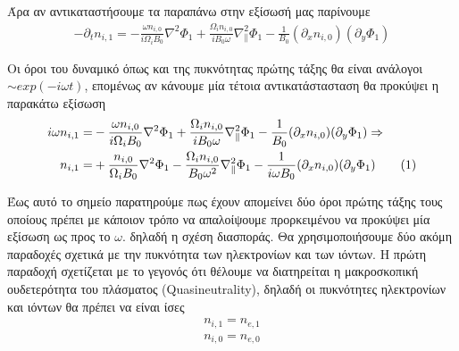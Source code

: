 \documentclass[a4paper]{article}
\newcommand\numberthis{\addtocounter{equation}{1}\tag{\theequation}}
\begin{document}
     Άρα αν αντικαταστήσουμε τα παραπάνω στην εξίσωσή μας παρίνουμε 
             	\begin{align}\label{eq13}
             		-\partial_t n_{i,1} = -\frac{\omega n_{i,0}}{i\Omega_iB_0} \nabla^2\Phi_1 
             		  +\frac{\Omega_in_{i,0}}{iB_0\omega }\nabla_{\parallel}^2\Phi_1   
             		  -\frac{1}{B_0}(\partial_xn_{i,0})(\partial_y\Phi_1)
				\end{align}
				
	Οι όροι του δυναμικό όπως και της πυκνότητας πρώτης τάξης θα είναι ανάλογοι $\sim exp(-i\omega t)$, επομένως αν κάνουμε μία τέτοια αντικατάστασταση θα προκύψει η παρακάτω εξίσωση 
	\begin{align*}\label{eq14}
		i\omega n_{i,1} =& -\frac{\omega n_{i,0}}{i\Omega_iB_0} \nabla^2\Phi_1 +\frac{\Omega_in_{i,0}}{iB_0\omega }\nabla_{\parallel}^2\Phi_1-\frac{1}{B_0}(\partial_xn_{i,0})(\partial_y\Phi_1) \Rightarrow\\ 
		n_{i,1} =&+ \frac{n_{i,0}}{\Omega_i B_0}\nabla^2\Phi_1 - \frac{\Omega_in_{i,0}}{B_0\omega^2	}\nabla_{\parallel}^2\Phi_1 - \frac{1}{i\omega B_0}(\partial_xn_{i,0})(\partial_y\Phi_1) \numberthis
	\end{align*}
	
		Έως αυτό το σημείο παρατηρούμε πως έχουν απομείνει δύο όροι πρώτης τάξης τους οποίους πρέπει με κάποιον τρόπο να απαλοίψουμε προρκειμένου να προκύψει μία εξίσωση ως προς το $\omega$. δηλαδή η σχέση διασποράς. Θα χρησιμοποιήσουμε δύο ακόμη παραδοχές σχετικά με την πυκνότητα των ηλεκτρονίων και των ιόντων. Η πρώτη παραδοχή σχετίζεται με το γεγονός ότι θέλουμε να διατηρείται η μακροσκοπική ουδετερότητα του πλάσματος (Quasineutrality), δηλαδή οι πυκνότητες ηλεκτρονίων και ιόντων θα πρέπει να είναι ίσες
		\begin{subequations}\label{eq15}
		\begin{align}
			n_{i,1} = n_{e,1} \\ 
			n_{i,0} = n_{e,0}
		\end{align}
		\end{subequations}
\end{document}
